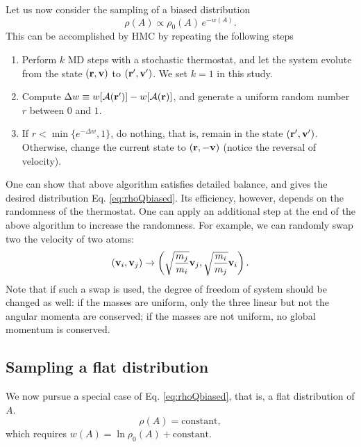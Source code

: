 \documentclass[notitlepage, preprint,superscriptaddress]{revtex4-1}
\begin{document}
Let us now consider the sampling of a biased distribution
\begin{equation}
  \rho(A) \propto \rho_0(A) \, e^{-w(A)}.
\label{eq:rhoQbiased}
\end{equation}
This can be accomplished by HMC by repeating the following steps
\begin{enumerate}
  \item Perform $k$ MD steps with a stochastic thermostat,
        and let the system evolute
        from the state $(\bm{\mathrm{r}}, \bm{\mathrm{v}})$ to $(\bm{\mathrm{r}}', \bm{\mathrm{v}}')$.
        We set $k = 1$ in this study.

  \item Compute $\Delta w \equiv w[\mathcal A(\bm{\mathrm{r}}')] - w[\mathcal A(\bm{\mathrm{r}})]$,
        and generate a uniform random number $r$ between $0$ and $1$.

  \item If $r < \min\{e^{-\Delta w}, 1\}$, do nothing,
        that is, remain in the state $(\bm{\mathrm{r}}', \bm{\mathrm{v}}')$.
        Otherwise, change the current state to $(\bm{\mathrm{r}}, -\bm{\mathrm{v}})$
        (notice the reversal of velocity).
\end{enumerate}




One can show that above algorithm satisfies detailed balance,
and gives the desired distribution Eq. \eqref{eq:rhoQbiased}.
%
Its efficiency, however, depends on the randomness of the thermostat.
%
One can apply an additional step at the end of the above algorithm
to increase the randomness.
%
For example, we can randomly swap two the velocity of two atoms:
\[
  (\bm{\mathrm{v}}_i, \bm{\mathrm{v}}_j)
 \rightarrow
  \left(
     \sqrt{ \frac{ m_j } {m_i}  } \bm{\mathrm{v}}_j,
     \sqrt{ \frac{ m_i } {m_j}  } \bm{\mathrm{v}}_i
  \right).
\]
Note that if such a swap is used,
the degree of freedom of system should be changed as well:
if the masses are uniform,
only the three linear but not the angular momenta are conserved;
if the masses are not uniform,
no global momentum is conserved.



\subsection{Sampling a flat distribution}



We now pursue a special case of Eq. \eqref{eq:rhoQbiased},
that is, a flat distribution of $A$.
\[
  \rho(A) = \mbox{constant},
\]
which requires $w(A) = \ln \rho_0(A) + \mbox{constant}$.
\end{document}
